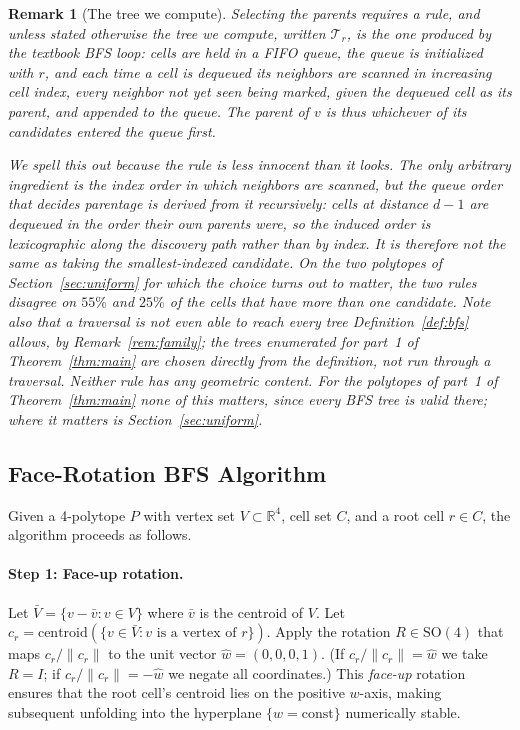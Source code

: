 \documentclass[11pt,letterpaper]{article}
\newtheorem{remark}{Remark}
\newcommand{\RR}{\mathbb{R}}
\begin{document}
\begin{remark}[The tree we compute]\label{rem:rule}
Selecting the parents requires a rule, and unless stated otherwise the
tree we compute, written $\mathcal{T}_r$, is the one produced by the textbook
BFS loop: cells are held in a FIFO queue, the queue is initialized with
$r$, and each time a cell is dequeued its neighbors are scanned in
increasing cell index, every neighbor not yet seen being marked, given
the dequeued cell as its parent, and appended to the queue.
The parent of $v$ is thus whichever of its candidates entered the queue
first.

We spell this out because the rule is less innocent than it looks.
The only arbitrary ingredient is the index order in which neighbors are
scanned, but the queue order that decides parentage is derived from it
recursively: cells at distance $d-1$ are dequeued in the order their
own parents were, so the induced order is lexicographic along the
discovery path rather than by index.
It is therefore not the same as taking the smallest-indexed candidate.
On the two polytopes of Section~\ref{sec:uniform} for which the choice
turns out to matter, the two rules disagree on $55\%$ and $25\%$ of the
cells that have more than one candidate.
Note also that a traversal is not even able to reach every tree
Definition~\ref{def:bfs} allows, by Remark~\ref{rem:family}; the trees
enumerated for part~1 of Theorem~\ref{thm:main} are chosen directly
from the definition, not run through a traversal.
Neither rule has any geometric content.
For the polytopes of part~1 of Theorem~\ref{thm:main} none of this
matters, since \emph{every} BFS tree is valid there; where it matters
is Section~\ref{sec:uniform}.
\end{remark}

\subsection{Face-Rotation BFS Algorithm}\label{sec:algorithm}


Given a 4-polytope $P$ with vertex set $V\subset\RR^4$,
cell set $C$, and a root cell $r\in C$, the algorithm proceeds
as follows.

\paragraph{Step 1: Face-up rotation.}
Let $\bar{V} = \{v - \bar{v} : v\in V\}$ where $\bar{v}$ is the
centroid of $V$.
Let $c_r = \mathrm{centroid}(\{v\in \bar{V}: v\text{ is a vertex of }r\})$.
Apply the rotation $R\in\mathrm{SO}(4)$ that maps
$c_r/\|c_r\|$ to the unit vector $\hat{w} = (0,0,0,1)$.
(If $c_r/\|c_r\| = \hat{w}$ we take $R=I$; if $c_r/\|c_r\|=-\hat{w}$
we negate all coordinates.)
This \emph{face-up} rotation ensures that the root cell's centroid
lies on the positive $w$-axis, making subsequent unfolding into the
hyperplane $\{w=\mathrm{const}\}$ numerically stable.
\end{document}
